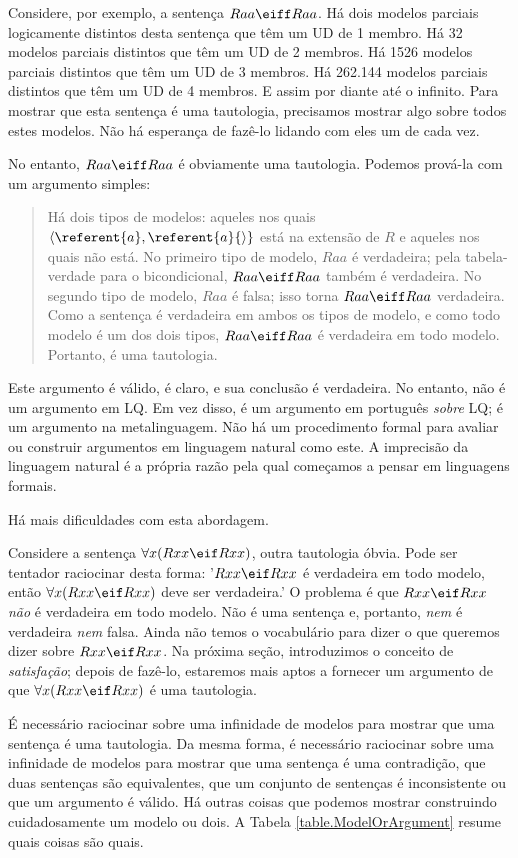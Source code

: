Considere, por exemplo, a sentença $Raa\eiff Raa$. Há dois modelos parciais logicamente distintos desta sentença que têm um UD de 1 membro. Há 32 modelos parciais distintos que têm um UD de 2 membros. Há 1526 modelos parciais distintos que têm um UD de 3 membros. Há 262.144 modelos parciais distintos que têm um UD de 4 membros. E assim por diante até o infinito. Para mostrar que esta sentença é uma tautologia, precisamos mostrar algo sobre todos estes modelos. Não há esperança de fazê-lo lidando com eles um de cada vez.

No entanto, $Raa\eiff Raa$ é obviamente uma tautologia. Podemos prová-la com um argumento simples:
\begin{quote}
\label{allmodels1}
Há dois tipos de modelos: aqueles nos quais ${\langle}\referent{a},\referent{a}{\rangle}$ está na extensão de $R$ e aqueles nos quais não está. No primeiro tipo de modelo, $Raa$ é verdadeira; pela tabela-verdade para o bicondicional, $Raa\eiff Raa$ também é verdadeira. No segundo tipo de modelo, $Raa$ é falsa; isso torna $Raa\eiff Raa$ verdadeira. Como a sentença é verdadeira em ambos os tipos de modelo, e como todo modelo é um dos dois tipos, $Raa\eiff Raa$ é verdadeira em todo modelo. Portanto, é uma tautologia.
\end{quote}
Este argumento é válido, é claro, e sua conclusão é verdadeira. No entanto, não é um argumento em LQ. Em vez disso, é um argumento em português \emph{sobre} LQ; é um argumento na metalinguagem. Não há um procedimento formal para avaliar ou construir argumentos em linguagem natural como este. A imprecisão da linguagem natural é a própria razão pela qual começamos a pensar em linguagens formais.

Há mais dificuldades com esta abordagem.

Considere a sentença $\forall x(Rxx\eif Rxx)$, outra tautologia óbvia. Pode ser tentador raciocinar desta forma: '$Rxx\eif Rxx$ é verdadeira em todo modelo, então $\forall x(Rxx\eif Rxx)$ deve ser verdadeira.' O problema é que $Rxx\eif Rxx$ \emph{não} é verdadeira em todo modelo. Não é uma sentença e, portanto, \emph{nem} é verdadeira \emph{nem} falsa. Ainda não temos o vocabulário para dizer o que queremos dizer sobre $Rxx\eif Rxx$. Na próxima seção, introduzimos o conceito de \emph{satisfação}; depois de fazê-lo, estaremos mais aptos a fornecer um argumento de que $\forall x(Rxx\eif Rxx)$ é uma tautologia.

É necessário raciocinar sobre uma infinidade de modelos para mostrar que uma sentença é uma tautologia. Da mesma forma, é necessário raciocinar sobre uma infinidade de modelos para mostrar que uma sentença é uma contradição, que duas sentenças são equivalentes, que um conjunto de sentenças é inconsistente ou que um argumento é válido. Há outras coisas que podemos mostrar construindo cuidadosamente um modelo ou dois. A Tabela \ref{table.ModelOrArgument} resume quais coisas são quais.

